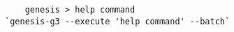 \begin{verbatim}
    genesis > help command
`genesis-g3 --execute 'help command' --batch`
\end{verbatim}
